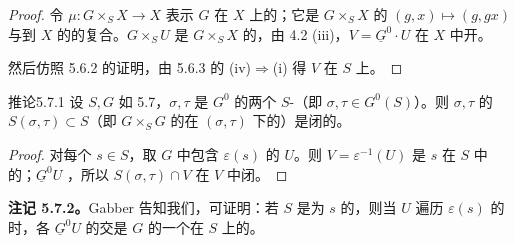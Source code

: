 \begin{proof}
令 $\mu:G\times_SX\to X$ 表示 $G$ 在 $X$ 上的；它是 $G\times_SX$ 的 $(g,x)\mapsto(g,gx)$ 与到 $X$ 的的复合。$G\times_SU$ 是 $G\times_SX$ 的，由 4.2 (iii)，$V=\underline G^0\cdot U$ 在 $X$ 中开。

然后仿照 5.6.2 的证明，由 5.6.3 的 (iv)$\Rightarrow$(i) 得 $V$ 在 $S$ 上。
\end{proof}
\begin{SGAresult}{推论}{5.7.1}
设 $S,G$ 如 5.7，$\sigma,\tau$ 是 $G^0$ 的两个 $S$-（即 $\sigma,\tau\in G^0(S)$）。则 $\sigma,\tau$ 的 $S(\sigma,\tau)\subset S$（即 $G\times_SG$ 的在 $(\sigma,\tau)$ 下的）是闭的。
\end{SGAresult}
\begin{proof}
对每个 $s\in S$，取 $G$ 中包含 $\varepsilon(s)$ 的 $U$。则 $V=\varepsilon^{-1}(U)$ 是 $s$ 在 $S$ 中的；$\underline G^0U$ ，所以 $S(\sigma,\tau)\cap V$ 在 $V$ 中闭。
\end{proof}
\textbf{注记 5.7.2。}Gabber 告知我们，可证明：若 $S$ 是为 $s$ 的，则当 $U$ 遍历 $\varepsilon(s)$ 的时，各 $\underline G^0U$ 的交是 $G$ 的一个在 $S$ 上的。

